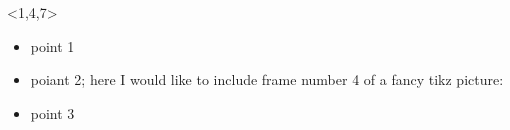 \documentclass{beamer}
\begin{document}
\begin{frame}<1,4,7>
  \begin{itemize}[<+->]
    \item point 1
    \item poiant 2; here I would like to include frame number 4 of a fancy tikz picture:\\
    
    \item<7> point 3
  \end{itemize}
\end{frame}
\end{document}

